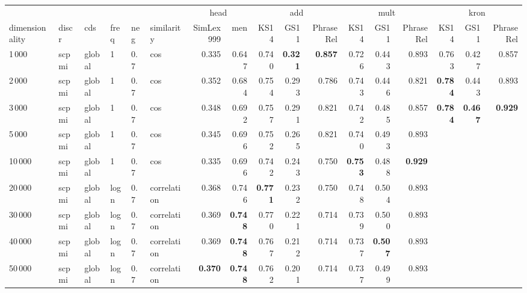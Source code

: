 \begin{tabular}{llllllrrrrrrrrrrr}
\toprule
      &      &   &   &     &             &      \multicolumn{2}{c}{head}         &    \multicolumn{3}{c}{add}                    &   \multicolumn{3}{c}{mult}                    &   \multicolumn{3}{c}{kron}                    \\
  \cmidrule(r){7-8} \cmidrule(r){9-11} \cmidrule(r){12-14} \cmidrule(r){15-17}
  dimensionality & discr & cds & freq & neg & similarity & SimLex999 &    men &   KS14 &   GS11 & PhraseRel &   KS14 &   GS11 & PhraseRel &   KS14 &   GS11 & PhraseRel \\
\midrule
1\,000  & scpmi & global & 1    & 0.7 & cos         &     0.335 &  0.647 &  0.740 &  \textbf{0.321} &     \textbf{0.857} &  0.726 &  0.443 &     0.893 &  0.763 &  0.427 &     0.857 \\
2\,000  & scpmi & global & 1    & 0.7 & cos         &     0.352 &  0.684 &  0.754 &  0.293 &     0.786 &  0.743 &  0.446 &     0.821 &  \textbf{0.784} &  0.443 &     0.893 \\
3\,000  & scpmi & global & 1    & 0.7 & cos         &     0.348 &  0.692 &  0.757 &  0.291 &     0.821 &  0.742 &  0.485 &     0.857 &  \textbf{0.784} &  \textbf{0.467} &     \textbf{0.929} \\
5\,000  & scpmi & global & 1    & 0.7 & cos         &     0.345 &  0.696 &  0.752 &  0.265 &     0.821 &  0.740 &  0.493 &     0.893 &     &     &        \\
10\,000 & scpmi & global & 1    & 0.7 & cos         &     0.335 &  0.696 &  0.742 &  0.243 &     0.750 &  \textbf{0.753} &  0.488 &     \textbf{0.929} &     &     &        \\
20\,000 & scpmi & global & logn & 0.7 & correlation &     0.368 &  0.746 &  \textbf{0.771} &  0.232 &     0.750 &  0.748 &  0.504 &     0.893 &     &     &        \\
30\,000 & scpmi & global & logn & 0.7 & correlation &     0.369 &  \textbf{0.748} &  0.770 &  0.221 &     0.714 &  0.739 &  0.500 &     0.893 &     &     &        \\
40\,000 & scpmi & global & logn & 0.7 & correlation &     0.369 &  \textbf{0.748} &  0.767 &  0.212 &     0.714 &  0.737 &  \textbf{0.507} &     0.893 &     &     &        \\
50\,000 & scpmi & global & logn & 0.7 & correlation &     \textbf{0.370} &  \textbf{0.748} &  0.762 &  0.201 &     0.714 &  0.737 &  0.499 &     0.893 &     &     &        \\
\bottomrule
\end{tabular}
